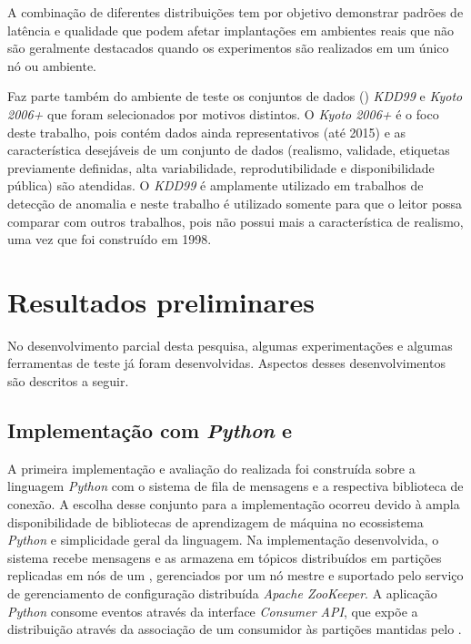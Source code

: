 A combinação de diferentes distribuições tem por objetivo demonstrar padrões de
latência e qualidade que podem afetar implantações em ambientes reais que não
são geralmente destacados quando os experimentos são realizados em um único
nó ou ambiente.

Faz parte também do ambiente de teste os conjuntos de dados (\datasets)
\emph{KDD99} e \emph{Kyoto 2006+} que foram selecionados por motivos distintos.
O \dataset \emph{Kyoto 2006+} é o foco deste trabalho, pois contém dados ainda
representativos (até 2015) e as característica desejáveis de um conjunto de dados
(realismo, validade, etiquetas previamente definidas, alta variabilidade,
reprodutibilidade e disponibilidade pública) são atendidas.
O \dataset \emph{KDD99} é amplamente utilizado em trabalhos de detecção de
anomalia e neste trabalho é utilizado somente para que o leitor possa comparar com outros
trabalhos, pois não possui mais a característica de realismo, uma vez que foi
construído em 1998.

\section{Resultados preliminares}\label{sec:resultados}

No desenvolvimento parcial desta pesquisa, algumas experimentações e algumas
ferramentas de teste já foram desenvolvidas.
Aspectos desses desenvolvimentos são descritos a seguir.

\newcommand{\python}{\emph{Python}\xspace}

\subsection{Implementação com \python e \kafka}

A primeira implementação e avaliação do \mfog realizada foi construída sobre a
linguagem \python com o sistema de fila de mensagens \kafka e a respectiva
biblioteca de conexão.
A escolha desse conjunto para a implementação ocorreu devido à ampla
disponibilidade de bibliotecas de aprendizagem de máquina no ecossistema
\python e simplicidade geral da linguagem.
Na implementação desenvolvida, o sistema \kafka recebe mensagens e as armazena em tópicos distribuídos em
partições replicadas em nós de um \cluster, gerenciados por um nó mestre e
suportado pelo serviço de gerenciamento de configuração distribuída \emph{Apache
ZooKeeper}.
A aplicação \emph{Python} consome eventos através da interface \emph{Consumer API},
que expõe a distribuição através da associação de um consumidor às partições
mantidas pelo \kafka.

